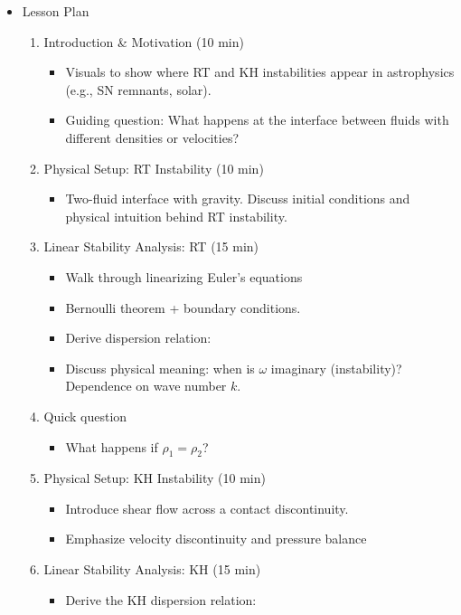 \begin{itemize}
\begin{enumerate}
  \end{enumerate}    
\item Lesson Plan
  \begin{enumerate}
  \item Introduction \& Motivation (10 min)
    \begin{itemize}
    \item Visuals to show where RT and KH instabilities appear in astrophysics (e.g., SN remnants, solar).
    \item Guiding question: What happens at the interface between fluids with different densities or velocities?
    \end{itemize}
  \item Physical Setup: RT Instability (10 min)
    \begin{itemize}
    \item  Two-fluid interface with gravity. Discuss initial conditions and physical intuition behind RT instability.
    \end{itemize}
  \item Linear Stability Analysis: RT (15 min)
    \begin{itemize}
    \item  Walk through linearizing Euler’s equations
    \item Bernoulli theorem + boundary conditions.
    \item Derive dispersion relation:
    \item Discuss physical meaning: when is $\omega$ imaginary
      (instability)? Dependence on wave number $k$.
    \end{itemize}
  \item {Quick question}
    \begin{itemize}
      \item What happens if $\rho_1=\rho_2$?
      \end{itemize}
    \item Physical Setup: KH Instability (10 min)
    \begin{itemize}
    \item Introduce shear flow across a contact discontinuity.
    \item Emphasize velocity discontinuity and pressure balance
      \end{itemize}

    \item Linear Stability Analysis: KH (15 min)
    \begin{itemize}
      \item Derive the KH dispersion relation:
      \end{itemize}


\end{enumerate}
\end{itemize}

